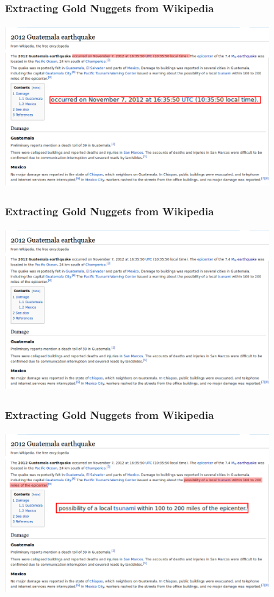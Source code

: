 \documentclass{beamer}
\begin{document}
\begin{frame}
\frametitle{Extracting Gold Nuggets from Wikipedia}
\vspace{5pt}
\includegraphics[width=325pt,height=200pt]{png/wp_evo_4}
\end{frame}

\begin{frame}
\frametitle{Extracting Gold Nuggets from Wikipedia}
\vspace{5pt}
\includegraphics[width=325pt,height=200pt]{png/wp_evo_3}
\end{frame}

\begin{frame}
\frametitle{Extracting Gold Nuggets from Wikipedia}
\vspace{5pt}
\includegraphics[width=325pt,height=200pt]{png/wp_evo_5}
\end{frame}
\end{document}

